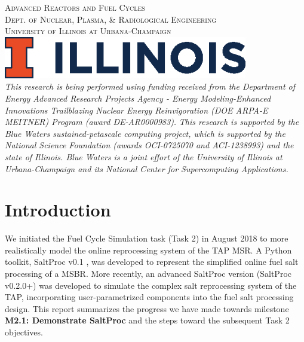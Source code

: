 \documentclass[12pt]{article} %
\begin{document}
\begin{titlepage}
    \textsc{\LARGE Advanced Reactors and Fuel Cycles}\\[0.25cm] %
    
    \textsc{\large Dept. of Nuclear, Plasma, \& Radiological Engineering}\\%
    
    \textsc{\large University of Illinois at Urbana-Champaign}\\ %


    \vspace{0.5cm}
    \includegraphics[width=0.8\textwidth]{illinois}\\[1cm] %

    \textit{This research is being performed using funding received from the 
    Department of Energy Advanced Research Projects Agency - Energy 
    Modeling-Enhanced Innovations Trailblazing Nuclear Energy Reinvigoration 
    (DOE ARPA-E MEITNER) Program (award DE-AR0000983).}
    \vspace{0.2mm}
    \textit{This research is supported by the Blue Waters sustained-petascale 
    computing project, which is supported by the National Science Foundation 
    (awards OCI-0725070 and ACI-1238993) and the state of Illinois. Blue Waters 
    is a joint effort of the University of Illinois at Urbana-Champaign and its 
    National Center for Supercomputing Applications.}

\end{titlepage}

\section{Introduction}
We initiated the Fuel Cycle Simulation task (Task 2) in August 2018 to more 
realistically model the online reprocessing system of the \gls{TAP} 
\gls{MSR}. A Python toolkit, SaltProc v0.1 \cite{rykhlevskii_modeling_2019,
rykhlevskii_advanced_2018, rykhlevskii_arfc/saltproc_2018}, was developed to 
represent the simplified online fuel salt processing of a \gls{MSBR}.
More recently, an advanced SaltProc version (SaltProc v0.2.0+) was developed 
to simulate the complex salt reprocessing system of the \gls{TAP}, 
incorporating user-parametrized components into the fuel salt processing 
design. This report summarizes the progress we have made towards milestone 
\textbf{M2.1: Demonstrate SaltProc} and the steps toward the subsequent Task 2 
objectives.
\end{document}
